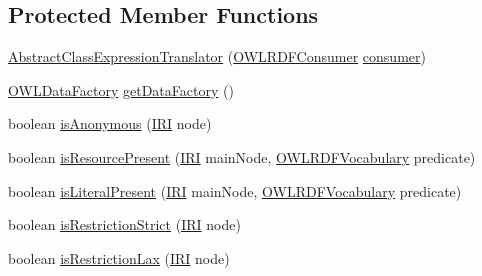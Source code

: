 \subsection*{Protected Member Functions}
\begin{DoxyCompactItemize}
\item 
\hyperlink{classorg_1_1coode_1_1owlapi_1_1rdfxml_1_1parser_1_1_abstract_class_expression_translator_a0e5aaac4add924a8298bcc8b43409808}{Abstract\-Class\-Expression\-Translator} (\hyperlink{classorg_1_1coode_1_1owlapi_1_1rdfxml_1_1parser_1_1_o_w_l_r_d_f_consumer}{O\-W\-L\-R\-D\-F\-Consumer} \hyperlink{classorg_1_1coode_1_1owlapi_1_1rdfxml_1_1parser_1_1_abstract_class_expression_translator_ae547084cdd5b92c03835b5aa404f823b}{consumer})
\item 
\hyperlink{interfaceorg_1_1semanticweb_1_1owlapi_1_1model_1_1_o_w_l_data_factory}{O\-W\-L\-Data\-Factory} \hyperlink{classorg_1_1coode_1_1owlapi_1_1rdfxml_1_1parser_1_1_abstract_class_expression_translator_a2629241718d643ec861364125b2822eb}{get\-Data\-Factory} ()
\item 
boolean \hyperlink{classorg_1_1coode_1_1owlapi_1_1rdfxml_1_1parser_1_1_abstract_class_expression_translator_a0545c64a3caa9b3bc78f7817abc7229a}{is\-Anonymous} (\hyperlink{classorg_1_1semanticweb_1_1owlapi_1_1model_1_1_i_r_i}{I\-R\-I} node)
\item 
boolean \hyperlink{classorg_1_1coode_1_1owlapi_1_1rdfxml_1_1parser_1_1_abstract_class_expression_translator_af0d8e50776ce80d3891d584f733295f3}{is\-Resource\-Present} (\hyperlink{classorg_1_1semanticweb_1_1owlapi_1_1model_1_1_i_r_i}{I\-R\-I} main\-Node, \hyperlink{enumorg_1_1semanticweb_1_1owlapi_1_1vocab_1_1_o_w_l_r_d_f_vocabulary}{O\-W\-L\-R\-D\-F\-Vocabulary} predicate)
\item 
boolean \hyperlink{classorg_1_1coode_1_1owlapi_1_1rdfxml_1_1parser_1_1_abstract_class_expression_translator_a1d20f60b03547d464fe7b493b1a58da5}{is\-Literal\-Present} (\hyperlink{classorg_1_1semanticweb_1_1owlapi_1_1model_1_1_i_r_i}{I\-R\-I} main\-Node, \hyperlink{enumorg_1_1semanticweb_1_1owlapi_1_1vocab_1_1_o_w_l_r_d_f_vocabulary}{O\-W\-L\-R\-D\-F\-Vocabulary} predicate)
\item 
boolean \hyperlink{classorg_1_1coode_1_1owlapi_1_1rdfxml_1_1parser_1_1_abstract_class_expression_translator_aa5f9785176a2e543feff673a18d7bb92}{is\-Restriction\-Strict} (\hyperlink{classorg_1_1semanticweb_1_1owlapi_1_1model_1_1_i_r_i}{I\-R\-I} node)
\item 
boolean \hyperlink{classorg_1_1coode_1_1owlapi_1_1rdfxml_1_1parser_1_1_abstract_class_expression_translator_ac3c573043bd31e4891c0391781bb35aa}{is\-Restriction\-Lax} (\hyperlink{classorg_1_1semanticweb_1_1owlapi_1_1model_1_1_i_r_i}{I\-R\-I} node)

\end{DoxyCompactItemize}
